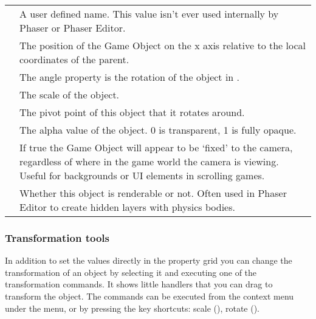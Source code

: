 \documentclass[letterpaper,10pt,english]{sphinxmanual}
\begin{document}
\begin{savenotes}\sphinxattablestart
\centering
\begin{tabulary}{\linewidth}[t]{|T|T|}
\hline
{}\relax &\relax \\
\hline
{}
&
A user defined name. This value isn’t ever used internally by Phaser or Phaser Editor.
\\
\hline
{}
&
The position of the Game Object on the x axis relative to the local coordinates of the parent.
\\
\hline
{}
&
The angle property is the rotation of the object in .
\\
\hline
{}
&
The scale of the object.
\\
\hline
{}
&
The pivot point of this object that it rotates around.
\\
\hline
{}
&
The alpha value of the object. 0 is transparent, 1 is fully opaque.
\\
\hline
{}
&
If true the Game Object will appear to be ‘fixed’ to the camera, regardless of where in the game world the camera is viewing. Useful for backgrounds or UI elements in scrolling games.
\\
\hline
{}
&
Whether this object is renderable or not. Often used in Phaser Editor to create hidden layers with physics bodies.
\\
\hline
\end{tabulary}
\par
\sphinxattableend\end{savenotes}


\subsubsection{Transformation tools}
\label{\detokenize{canvas:transformation-tools}}
In addition to set the values directly in the property grid you can change the transformation of an object by selecting it and executing one of the transformation commands. It shows little handlers that you can drag to transform the object. The commands can be executed from the context menu under the  menu, or by pressing the key shortcuts: scale (), rotate ().
\end{document}
